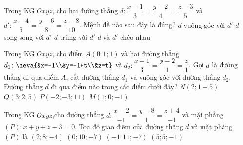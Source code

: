 	\begin{ex}%
	Trong KG $Oxyz$, cho hai đường thẳng $d: \dfrac{x-1}{3}=\dfrac{y-2}{4}=\dfrac{z-3}{5}$ và $d':\dfrac{x-4}{6}=\dfrac{y-6}{8}=\dfrac{z-8}{10}$. Mệnh đề nào sau đây là đúng?
	\choice 
	{$d$ vuông góc với $d'$}
	{$d$ song song với $d'$}
	{\True $d$ trùng với $d'$}
	{$d$ và $d'$ chéo nhau} 
	\end{ex} 
	\begin{ex}%
	Trong KG $Oxyz$, cho điểm $A(0;1;1)$ và hai đường thẳng $d_1\colon \heva{&x=-1\\&y=-1+t\\&z=t}$ và $d_2\colon \dfrac{x-1}{3}=\dfrac{y-2}{1}=\dfrac{z}{1}$. Gọi $d$ là đường thẳng đi qua điểm $A$, cắt đường thẳng $d_1$ và vuông góc với đường thẳng $d_2$. Đường thẳng $d$ đi qua điểm nào trong các điểm dưới đây?
	\choice%
	{$N(2;1-5)$}
	{$Q(3;2;5)$}
	{$P(-2;-3;11)$}
	{\True $M(1;0;-1)$}
	\end{ex}
	\begin{ex}%
	Trong KG $Oxyz$,cho đường thẳng $d\colon \dfrac{x-2}{-1} =\dfrac{y-8}{1} =\dfrac{z+4}{-1}$ và mặt phẳng $(P)\colon x+y+z-3=0$. Tọa độ giao điểm của đường thẳng $d$ và mặt phẳng $(P)$ là
	\choice
	{$(2;8;-4)$}
	{$(0;10;-7)$}
	{\True $(-1;11;-7)$}
	{$(5;5;-1)$}
	\end{ex}
